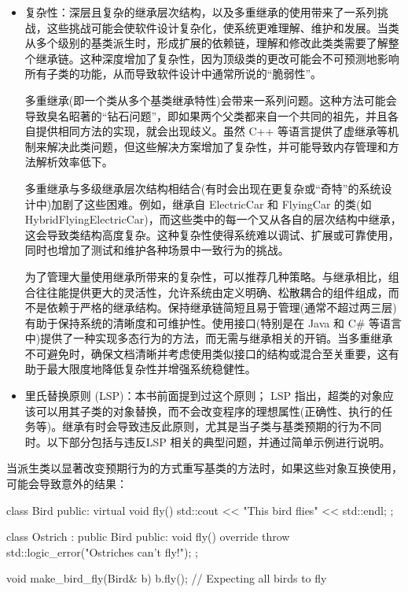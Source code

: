 \begin{itemize}
\item
复杂性：深层且复杂的继承层次结构，以及多重继承的使用带来了一系列挑战，这些挑战可能会使软件设计复杂化，使系统更难理解、维护和发展。当类从多个级别的基类派生时，形成扩展的依赖链，理解和修改此类类需要了解整个继承链。这种深度增加了复杂性，因为顶级类的更改可能会不可预测地影响所有子类的功能，从而导致软件设计中通常所说的“脆弱性”。

多重继承(即一个类从多个基类继承特性)会带来一系列问题。这种方法可能会导致臭名昭著的“钻石问题”，即如果两个父类都来自一个共同的祖先，并且各自提供相同方法的实现，就会出现歧义。虽然 C++ 等语言提供了虚继承等机制来解决此类问题，但这些解决方案增加了复杂性，并可能导致内存管理和方法解析效率低下。

多重继承与多级继承层次结构相结合(有时会出现在更复杂或“奇特”的系统设计中)加剧了这些困难。例如，继承自 ElectricCar 和 FlyingCar 的类(如 HybridFlyingElectricCar)，而这些类中的每一个又从各自的层次结构中继承，这会导致类结构高度复杂。这种复杂性使得系统难以调试、扩展或可靠使用，同时也增加了测试和维护各种场景中一致行为的挑战。

为了管理大量使用继承所带来的复杂性，可以推荐几种策略。与继承相比，组合往往能提供更大的灵活性，允许系统由定义明确、松散耦合的组件组成，而不是依赖于严格的继承结构。保持继承链简短且易于管理(通常不超过两三层)有助于保持系统的清晰度和可维护性。使用接口(特别是在 Java 和 C\# 等语言中)提供了一种实现多态行为的方法，而无需与继承相关的开销。当多重继承不可避免时，确保文档清晰并考虑使用类似接口的结构或混合至关重要，这有助于最大限度地降低复杂性并增强系统稳健性。

\item
里氏替换原则 (LSP)：本书前面提到过这个原则； LSP 指出，超类的对象应该可以用其子类的对象替换，而不会改变程序的理想属性(正确性、执行的任务等)。继承有时会导致违反此原则，尤其是当子类与基类预期的行为不同时。以下部分包括与违反LSP 相关的典型问题，并通过简单示例进行说明。
\end{itemize}


当派生类以显著改变预期行为的方式重写基类的方法时，如果这些对象互换使用，可能会导致意外的结果：

\begin{cpp}
class Bird {
public:
    virtual void fly() {
        std::cout << "This bird flies" << std::endl;
    }
};

class Ostrich : public Bird {
public:
    void fly() override {
        throw std::logic_error("Ostriches can't fly!");
    }
};

void make_bird_fly(Bird& b) {
    b.fly(); // Expecting all birds to fly
}
\end{cpp}

